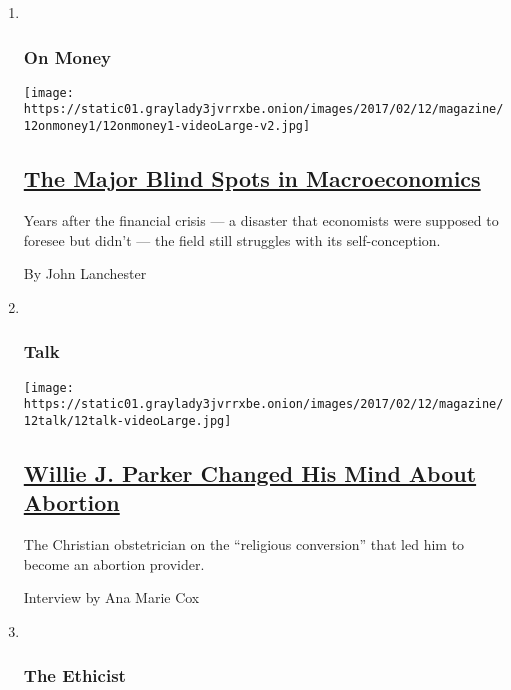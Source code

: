 \begin{enumerate}
\def\labelenumi{\arabic{enumi}.}
\item ~
  \hypertarget{on-money}{%
  \subsubsection{On Money}\label{on-money}}

  \texttt{[image: https://static01.graylady3jvrrxbe.onion/images/2017/02/12/magazine/12onmoney1/12onmoney1-videoLarge-v2.jpg]}

  \hypertarget{the-major-blind-spots-in-macroeconomics}{%
  \subsection{\texorpdfstring{\href{/2017/02/07/magazine/the-major-blind-spots-in-macroeconomics.html}{The
  Major Blind Spots in
  Macroeconomics}}{The Major Blind Spots in Macroeconomics}}\label{the-major-blind-spots-in-macroeconomics}}

  Years after the financial crisis --- a disaster that economists were
  supposed to foresee but didn't --- the field still struggles with its
  self-conception.

  By John Lanchester
\item ~
  \hypertarget{talk}{%
  \subsubsection{Talk}\label{talk}}

  \texttt{[image: https://static01.graylady3jvrrxbe.onion/images/2017/02/12/magazine/12talk/12talk-videoLarge.jpg]}

  \hypertarget{willie-j-parker-changed-his-mind-about-abortion}{%
  \subsection{\texorpdfstring{\href{/2017/02/08/magazine/willie-j-parker-changed-his-mind-about-abortion.html}{Willie
  J. Parker Changed His Mind About
  Abortion}}{Willie J. Parker Changed His Mind About Abortion}}\label{willie-j-parker-changed-his-mind-about-abortion}}

  The Christian obstetrician on the ``religious conversion'' that led
  him to become an abortion provider.

  Interview by Ana Marie Cox
\item ~
  \hypertarget{the-ethicist}{%
  \subsubsection{The Ethicist}\label{the-ethicist}}


\end{enumerate}
